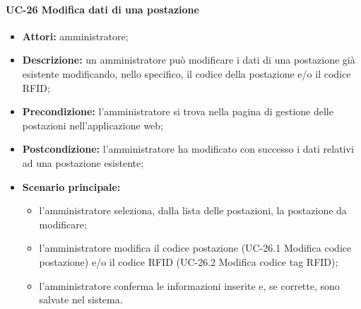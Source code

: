 \paragraph{UC-26 Modifica dati di una postazione}
\begin{itemize}
    \item \textbf{Attori:} amministratore;
    \item \textbf{Descrizione:} un amministratore pu\`{o} modificare i dati di una postazione già esistente modificando, nello specifico, il codice della postazione e/o il codice RFID;
    \item \textbf{Precondizione:} l'amministratore si trova nella pagina di gestione delle postazioni nell'applicazione web;
    \item \textbf{Postcondizione:} l'amministratore ha modificato con successo i dati relativi ad una postazione esistente;
    \item \textbf{Scenario principale:}
    \begin{itemize}
        \item l'amministratore seleziona, dalla lista delle postazioni, la postazione da modificare;
        \item l'amministratore modifica il codice postazione (UC-26.1 Modifica codice postazione) e/o il codice RFID (UC-26.2 Modifica codice tag RFID);
        \item l'amministratore conferma le informazioni inserite e, se corrette, sono salvate nel sistema.
    \end{itemize}
\end{itemize}


